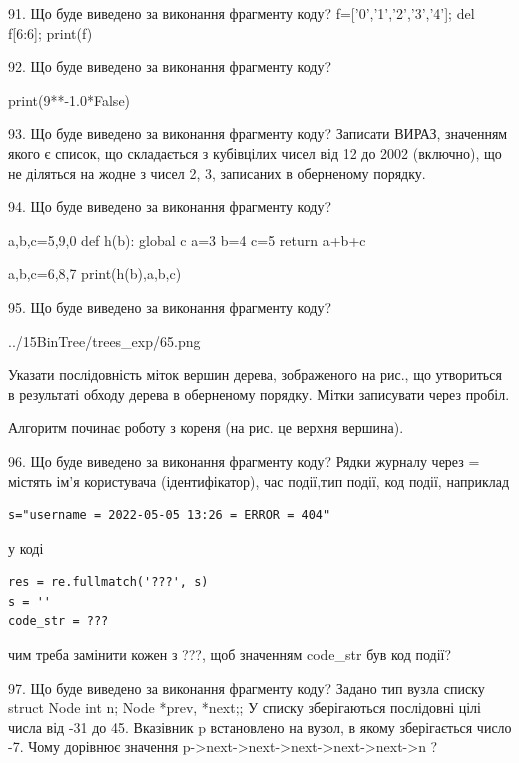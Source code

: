 \documentclass[11pt]{article}
\begin{document}

91. Що буде виведено за виконання фрагменту коду?
f=['0','1','2','3','4']; del f[6:6]; print(f)

92. Що буде виведено за виконання фрагменту коду?

print(9**-1.0*False)


93. Що буде виведено за виконання фрагменту коду?
Записати ВИРАЗ, значенням якого є список, що складається з кубівцілих чисел від 12 до 2002 (включно), що не діляться на жодне з чисел 2, 3, записаних в оберненому порядку.

94. Що буде виведено за виконання фрагменту коду?

a,b,c=5,9,0
def h(b):
global c    a=3
    b=4
    c=5
    return a+b+c

a,b,c=6,8,7
print(h(b),a,b,c)


95. Що буде виведено за виконання фрагменту коду?

\begin{center}
	{../15BinTree/trees_exp/65.png}
\end{center}
Указати послідовність міток вершин дерева, зображеного на рис., що утвориться в результаті обходу дерева в оберненому порядку. Мітки записувати через пробіл.\par Алгоритм починає роботу з кореня (на рис. це верхня вершина).


96. Що буде виведено за виконання фрагменту коду?
Рядки журналу через = містять ім'я користувача (ідентифікатор), час події,тип події, код події, наприклад
\begin{verbatim}
s="username = 2022-05-05 13:26 = ERROR = 404"
\end{verbatim}
у коді 
\begin{verbatim}
res = re.fullmatch('???', s) 
s = ''
code_str = ??? 
\end{verbatim}
чим треба замінити кожен з ???, щоб значенням code\_str був код події? 




97. Що буде виведено за виконання фрагменту коду?
Задано тип вузла списку struct Node {int n; Node *prev, *next;};
У списку зберігаються послідовні цілі числа від -31 до 45. Вказівник p встановлено на вузол, в якому зберігається число -7.
Чому дорівнює значення p->next->next->next->next->next->n ?
\end{document}
